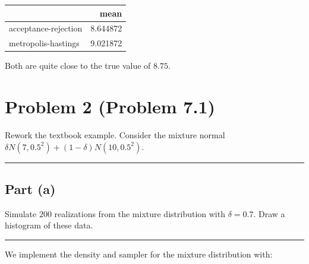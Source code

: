 \documentclass[
  11pt,
]{paper}
\begin{document}
\begin{longtable}[]{@{}lr@{}}
\toprule\noalign{}
& mean \\
\midrule\noalign{}
\endhead
\bottomrule\noalign{}
\endlastfoot
acceptance-rejection & 8.644872 \\
metropolis-hastings & 9.021872 \\
\end{longtable}

Both are quite close to the true value of \(8.75\).

\hypertarget{problem-2-problem-7.1}{%
\section{Problem 2 (Problem 7.1)}\label{problem-2-problem-7.1}}

Rework the textbook example. Consider the mixture normal
\(\delta N(7,0.5^2) + (1-\delta) N(10,0.5^2)\).

\begin{center}\rule{0.5\linewidth}{0.5pt}\end{center}

\hypertarget{part-a-1}{%
\subsection{Part (a)}\label{part-a-1}}

Simulate \(200\) realizations from the mixture distribution with
\(\delta = 0.7\). Draw a histogram of these data.

\begin{center}\rule{0.5\linewidth}{0.5pt}\end{center}

We implement the density and sampler for the mixture distribution with:
\end{document}
